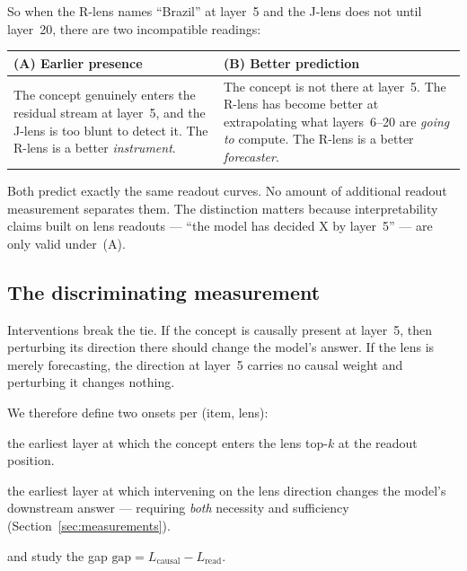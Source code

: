 \documentclass[11pt,a4paper]{article}
\newcommand{\jlens}{J\nobreakdash-lens}
\newcommand{\rlens}{R\nobreakdash-lens}
\newcommand{\Lread}{L_{\text{read}}}
\newcommand{\Lcaus}{L_{\text{causal}}}
\begin{document}
So when the \rlens{} names ``Brazil'' at layer~5 and the \jlens{} does not until
layer~20, there are two incompatible readings:

\begin{center}
\begin{tabular}{@{}p{}p{}@{}}
\toprule
\textbf{(A) Earlier presence} & \textbf{(B) Better prediction} \\
\midrule
The concept genuinely enters the residual stream at layer~5, and the \jlens{} is too
blunt to detect it. The \rlens{} is a better \emph{instrument}. &
The concept is not there at layer~5. The \rlens{} has become better at extrapolating
what layers~6--20 are \emph{going to} compute. The \rlens{} is a better
\emph{forecaster}. \\
\bottomrule
\end{tabular}
\end{center}

\noindent
Both predict exactly the same readout curves. No amount of additional readout
measurement separates them. The distinction matters because interpretability claims
built on lens readouts --- ``the model has decided X by layer~5'' --- are only valid
under~(A).

\subsection{The discriminating measurement}

Interventions break the tie. If the concept is causally present at layer~5, then
perturbing its direction there should change the model's answer. If the lens is merely
forecasting, the direction at layer~5 carries no causal weight and perturbing it
changes nothing.

We therefore define two onsets per (item, lens):

\begin{description}[leftmargin=1.4em,style=nextline]
\item[Readout onset $\Lread$] the earliest layer at which the concept enters the lens
  top-$k$ at the readout position.
\item[Causal onset $\Lcaus$] the earliest layer at which intervening on the lens
  direction changes the model's downstream answer --- requiring \emph{both} necessity
  and sufficiency (Section~\ref{sec:measurements}).
\end{description}

\noindent
and study the gap $\text{gap} = \Lcaus - \Lread$.
\end{document}
